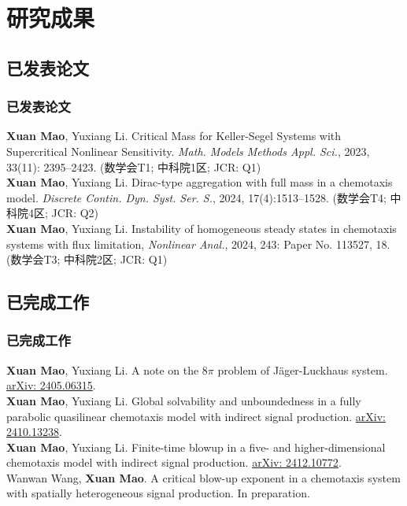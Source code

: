 \section{研究成果}
\subsection{已发表论文}

\begin{frame}
  \frametitle{已发表论文}
  \textbf{Xuan Mao}, Yuxiang Li.
  Critical Mass for Keller-Segel Systems with Supercritical Nonlinear Sensitivity. 
  \emph{Math. Models Methods Appl. Sci.}, 2023, 33(11): 2395--2423.
  \hfill (数学会T1; 中科院1区; JCR: Q1)\\
  \textbf{Xuan Mao}, Yuxiang Li. 
  Dirac-type aggregation with full mass in a chemotaxis model. 
  \emph{Discrete Contin. Dyn. Syst. Ser. S.}, 2024, 17(4):1513--1528. 
  \hfill (数学会T4; 中科院4区; JCR: Q2)\\
  \textbf{Xuan Mao}, Yuxiang Li. 
  Instability of homogeneous steady states in chemotaxis systems with flux limitation, 
  \emph{Nonlinear Anal.}, 2024, 243: Paper No. 113527, 18.
  \hfill (数学会T3; 中科院2区; JCR: Q1)
  \end{frame}

\subsection{已完成工作}

\begin{frame}
  \frametitle{已完成工作}
  \textbf{Xuan Mao}, Yuxiang Li. 
  A note on the $8\pi$ problem of J\"ager-Luckhaus system.
  \href{https://doi.org/10.48550/arXiv.2405.06315}
  {arXiv: 2405.06315}.\\ 
  \textbf{Xuan Mao}, Yuxiang Li.
  Global solvability and unboundedness in a fully parabolic quasilinear chemotaxis model with indirect signal production.
  \href{https://arxiv.org/abs/2410.13238}
  {arXiv: 2410.13238}.\\
  \textbf{Xuan Mao}, Yuxiang Li. Finite-time blowup in a five- and higher-dimensional chemotaxis model with indirect signal production. %
\href{https://arxiv.org/pdf/2412.10772}{arXiv: 2412.10772}.\\
Wanwan Wang, \textbf{Xuan Mao}. A critical blow-up exponent in a chemotaxis system with spatially heterogeneous signal production. In preparation.
\end{frame}

